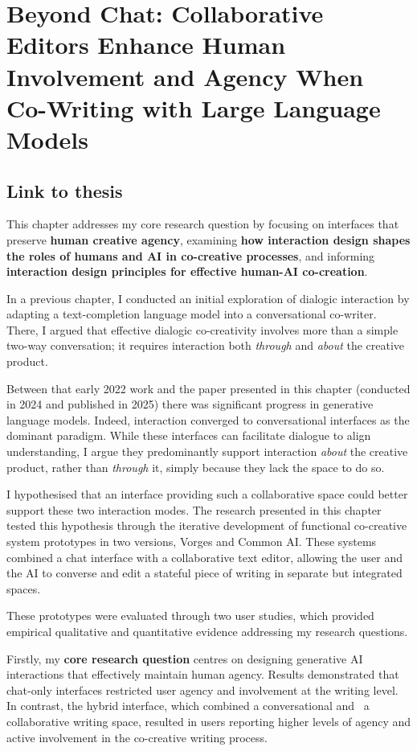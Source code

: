
\chapter{Beyond Chat: Collaborative Editors Enhance Human Involvement and Agency When Co-Writing with Large Language Models} \label{c:tc5} 


\section{Link to thesis}

This chapter addresses my core research question by focusing on interfaces that preserve \textbf{human creative agency}, examining \textbf{how interaction design shapes the roles of humans and AI in co-creative processes}, and informing \textbf{interaction design principles for effective human-AI co-creation}.

In a previous chapter, I conducted an initial exploration of dialogic interaction by adapting a text-completion language model into a conversational co-writer. There, I argued that effective dialogic co-creativity involves more than a simple two-way conversation; it requires interaction both \textit{through} and \textit{about} the creative product.

Between that early 2022 work and the paper presented in this chapter (conducted in 2024 and published in 2025) there was significant progress in generative language models. Indeed, interaction converged to conversational interfaces as the dominant paradigm. While these interfaces can facilitate dialogue to align understanding, I argue they predominantly support interaction \textit{about} the creative product, rather than \textit{through} it, simply because they lack the space to do so.

I hypothesised that an interface providing such a collaborative space could better support these two interaction modes. The research presented in this chapter tested this hypothesis through the iterative development of functional co-creative system prototypes in two versions, Vorges and Common AI. These systems combined a chat interface with a collaborative text editor, allowing the user and the AI to converse and edit a stateful piece of writing in separate but integrated spaces.

These prototypes were evaluated through two user studies, which provided empirical qualitative and quantitative evidence addressing my research questions.

Firstly, my \textbf{core research question} centres on designing generative AI interactions that effectively maintain human agency. Results demonstrated that chat-only interfaces restricted user agency and involvement at the writing level. In contrast, the hybrid interface, which combined a conversational and  a collaborative writing space, resulted in users reporting higher levels of agency and active involvement in the co-creative writing process.

